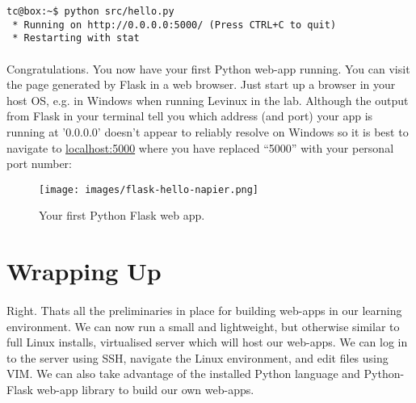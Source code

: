 \documentclass[12pt, a4paper, twoside]{book}
\begin{document}
\begin{lstlisting}[style=DOS]
tc@box:~$ python src/hello.py 
 * Running on http://0.0.0.0:5000/ (Press CTRL+C to quit)
 * Restarting with stat
\end{lstlisting}

\paragraph{} Congratulations. You now have your first Python web-app running. You can visit the page generated by Flask in a web browser. Just start up a browser in your host OS, e.g. in Windows when running Levinux in the lab. Although the output from Flask in your terminal tell you which address (and port) your app is running at '0.0.0.0' doesn't appear to reliably resolve on Windows so it is best to navigate to \url{localhost:5000} where you have replaced ``5000'' with your personal port number:

\begin{figure}[H]
\centering
\texttt{[image: images/flask-hello-napier.png]}
\caption{Your first Python Flask web app.}
\label{fig:flask-hello-napier}
\end{figure}

\section{Wrapping Up}
\label{chapter_02_wrap-up}
\paragraph{} Right. Thats all the preliminaries in place for building web-apps in our learning environment. We can now run a small and lightweight, but otherwise similar to full Linux installs, virtualised server which will host our web-apps. We can log in to the server using SSH, navigate the Linux environment, and edit files using VIM. We can also take advantage of the installed Python language and Python-Flask web-app library to build our own web-apps.
\end{document}
